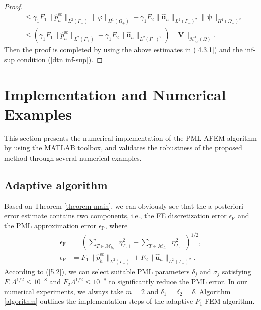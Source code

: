 \documentclass[final,3p,times]{elsarticle}
\begin{document}
\begin{proof}
\begin{align*}
		& \leq \gamma_1 F_1\|\hat{p}^{\mathrm{sc}}_h \|_{L^2(\Gamma_+)}\|\varphi\|_{H^1(\Omega_+)} + \gamma_1 F_2\|\hat{\boldsymbol{u}}_h \|_{L^2(\Gamma_-)^2}\|\boldsymbol{\psi}\|_{H^1(\Omega_-)^2} \\
		& \leq \left(\gamma_1 F_1\|\hat{p}^{\mathrm{sc}}_h \|_{L^2(\Gamma_+)} + \gamma_1 F_2\|\hat{\boldsymbol{u}}_h \|_{L^2(\Gamma_-)^2}\right)\|\boldsymbol{V}\|_{\mathscr{H}^1_\mathrm{qp}(\Omega)}.
	\end{align*}
	Then the proof is completed by using the above estimates in (\ref{4.3.1}) and the inf-sup condition (\ref{dtn inf-sup}).
\end{proof}

\section{Implementation and Numerical Examples} \label{SECTION5}
This section presents the numerical implementation of the PML-AFEM algorithm by using the MATLAB toolbox, and validates the robustness of the proposed method through several numerical examples.

\subsection{Adaptive algorithm}
Based on Theorem \ref{theorem main}, we can obviously see that the a posteriori error estimate contains two components, i.e., the FE discretization error $\epsilon_{\mathrm{F}}$ and the PML approximation error $\epsilon_{\mathrm{P}}$, where
\begin{align}
	\epsilon_{\mathrm{F}} &=\left(\sum_{T \in \mathscr{M}_{h, +}} \eta_{T, +}^2+\sum_{T \in \mathscr{M}_{h, -}} \eta_{T, -}^2\right)^{1 / 2}, \label{5.1}\\
	\epsilon_{\mathrm{P}} &= F_1\|\hat{p}^{\mathrm{sc}}_h \|_{L^2(\Gamma_+)} +  F_2\|\hat{\boldsymbol{u}}_h \|_{L^2(\Gamma_-)^2}.\label{5.2}
\end{align}
According to (\ref{5.2}), we can select suitable PML parameters $\delta_j$ and $\sigma_j$ satisfying $F_1 \Lambda^{1 / 2} \leq 10^{-8}$ and $F_2 \Lambda^{1 / 2} \leq 10^{-8}$ to significantly reduce the PML error. In our numerical experiments, we always take $m=2$ and $\delta_1=\delta_2=\delta$. Algorithm \ref{algorithm} outlines the implementation steps of the adaptive $P_1$-FEM algorithm.
\end{document}
